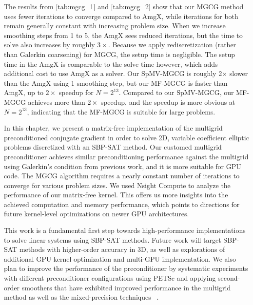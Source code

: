The results from \autoref{tab:mgcg_1} and \autoref{tab:mgcg_2} show that our MGCG method uses fewer iterations to converge compared to AmgX, while iterations for both remain generally constant with increasing problem size. When we increase smoothing steps from 1 to 5, the AmgX sees reduced iterations, but the time to solve also increases by roughly $3\times$.
Because we apply rediscretization (rather than Galerkin coarsening) for MGCG, the setup time is negligible.
The setup time in the AmgX is comparable to the solve time however, which adds additional cost to use AmgX as a solver.
Our SpMV-MGCG is roughly 2$\times$ slower than the AmgX using 1 smoothing step, but our MF-MGCG is faster than AmgX, up to $2\times$ speedup for $N = 2^{13}$.
Compared to our SpMV-MGCG, our MF-MGCG achieves more than $2\times$ speedup, and the speedup is more obvious at $N=2^{13}$, indicating that the MF-MGCG is suitable for large problems.


In this chapter, we present a matrix-free implementation of the multigrid preconditioned conjugate gradient in order to solve 2D, variable coefficient elliptic problems discretized with an SBP-SAT method.
Our customed multigrid preconditioner achieves similar preconditioning performance against the multigrid using Galerkin's condition from previous work, and it is more suitable for GPU code.
The MGCG algorithm requires a nearly constant number of iterations to converge for various problem sizes. 
We used Nsight Compute to analyze the performance of our matrix-free kernel. This offers us more insights into the achieved computation and memory performance, which points to directions for future kernel-level optimizations on newer GPU architectures.

This work is a fundamental first step towards high-performance implementations to solve linear systems using SBP-SAT methods. Future work will target SBP-SAT methods with higher-order accuracy in 3D, as well as explorations of additional GPU kernel optimization and multi-GPU implementation. We also plan to improve the performance of the preconditioner by systematic experiments with different preconditioner configurations using PETSc and applying second-order smoothers that have exhibited improved performance in the multigrid method as well as the mixed-precision techniques ~\citep{golub1961chebyshev,gutknecht2002chebyshev,abdelfattah2021survey}.